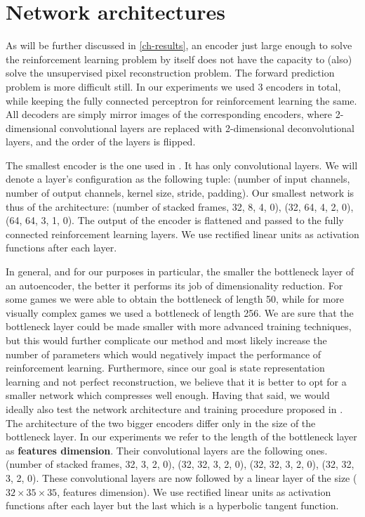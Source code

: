 \section{Network architectures}
\label{sec-net-arch}
As will be further discussed in \ref{ch-results},
an encoder just large enough to solve the reinforcement learning problem
by itself does not have the capacity to (also) solve the unsupervised pixel reconstruction
problem.
The forward prediction problem is more difficult still.
In our experiments we used 3 encoders in total, while keeping the fully connected perceptron
for reinforcement learning the same.
All decoders are simply mirror images of the corresponding encoders, where
2-dimensional convolutional layers are replaced with 2-dimensional deconvolutional layers,
and the order of the layers is flipped.

The smallest encoder is the one used in \cite{mnih2015humanlevel}.
It has only convolutional layers.
We will denote a layer's configuration as the following tuple:
(number of input channels, number of output
channels, kernel size, stride, padding).
Our smallest network is thus of the architecture:
(number of stacked frames, 32, 8, 4, 0), (32, 64, 4, 2, 0), (64, 64, 3, 1, 0).
The output of the encoder is flattened and passed to the fully connected reinforcement learning
layers. We use rectified linear units as activation functions after each layer.

In general, and for our purposes in particular, the smaller the bottleneck layer
of an autoencoder, the better it performs its job of dimensionality reduction.
For some games we were able to obtain the bottleneck of length 50, while for more visually 
complex games we used a bottleneck of length 256.
We are sure that the bottleneck layer could be made smaller with more advanced training
techniques, but this would further complicate our method and most likely 
increase the number of parameters which would negatively impact the performance of
reinforcement learning.
Furthermore, since our goal is state representation learning and not perfect reconstruction,
we believe that it is better to opt for a smaller network which compresses well enough.
Having that said, we would ideally also test the network architecture and
training procedure proposed in \cite{oh2015action}.
The architecture of the two bigger encoders differ only in the size of the bottleneck layer.
In our experiments we refer to the length of the bottleneck layer
as \textbf{features dimension}.
Their convolutional layers are the following ones. 
(number of stacked frames, 32, 3, 2, 0), 
(32, 32, 3, 2, 0),
(32, 32, 3, 2, 0),
(32, 32, 3, 2, 0).
These convolutional layers are now followed by a linear layer of the size
($32 \times 35 \times 35$, features dimension).
We use rectified linear units as activation functions after each layer but the last
which is a hyperbolic tangent function.

